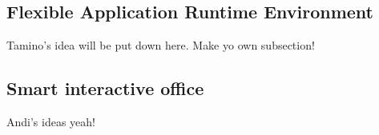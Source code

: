 \subsection{Flexible Application Runtime Environment}

Tamino's idea will be put down here.
Make yo own subsection!

\subsection{Smart interactive office}
Andi's ideas yeah!